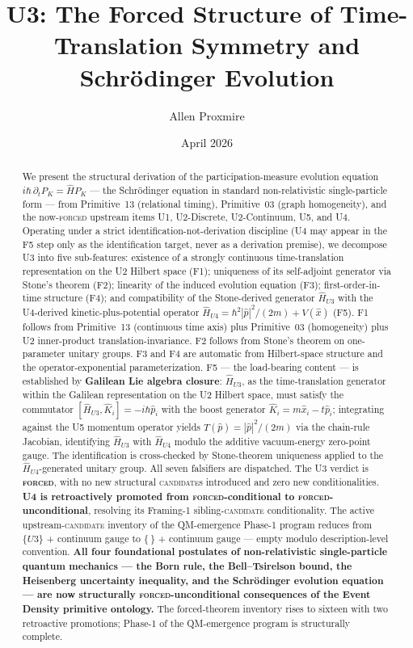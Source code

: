\documentclass[11pt,a4paper]{article}
\title{U3: The Forced Structure of Time-Translation Symmetry and Schr\"odinger Evolution}
\author{Allen Proxmire}
\date{April 2026}
\begin{document}
\maketitle

\begin{abstract}
We present the structural derivation of the participation-measure evolution equation $i\hbar \, \partial_t P_K = \hat{H} P_K$ --- the Schr\"odinger equation in standard non-relativistic single-particle form --- from Primitive~13 (relational timing), Primitive~03 (graph homogeneity), and the now-\textsc{forced} upstream items U1, U2-Discrete, U2-Continuum, U5, and U4. Operating under a strict identification-not-derivation discipline (U4 may appear in the F5 step only as the identification target, never as a derivation premise), we decompose U3 into five sub-features: existence of a strongly continuous time-translation representation on the U2 Hilbert space (F1); uniqueness of its self-adjoint generator via Stone's theorem (F2); linearity of the induced evolution equation (F3); first-order-in-time structure (F4); and compatibility of the Stone-derived generator $\hat{H}_{U3}$ with the U4-derived kinetic-plus-potential operator $\hat{H}_{U4} = \hbar^2|\hat{p}|^2/(2m) + V(\hat{x})$ (F5). F1 follows from Primitive~13 (continuous time axis) plus Primitive~03 (homogeneity) plus U2 inner-product translation-invariance. F2 follows from Stone's theorem on one-parameter unitary groups. F3 and F4 are automatic from Hilbert-space structure and the operator-exponential parameterization. F5 --- the load-bearing content --- is established by \textbf{Galilean Lie algebra closure}: $\hat{H}_{U3}$, as the time-translation generator within the Galilean representation on the U2 Hilbert space, must satisfy the commutator $[\hat{H}_{U3}, \hat{K}_i] = -i\hbar\hat{p}_i$ with the boost generator $\hat{K}_i = m\hat{x}_i - t\hat{p}_i$; integrating against the U5 momentum operator yields $T(\hat{p}) = |\hat{p}|^2/(2m)$ via the chain-rule Jacobian, identifying $\hat{H}_{U3}$ with $\hat{H}_{U4}$ modulo the additive vacuum-energy zero-point gauge. The identification is cross-checked by Stone-theorem uniqueness applied to the $\hat{H}_{U4}$-generated unitary group. All seven falsifiers are dispatched. The U3 verdict is \textbf{\textsc{forced}}, with no new structural \textsc{candidate}s introduced and zero new conditionalities. \textbf{U4 is retroactively promoted from \textsc{forced}-conditional to \textsc{forced}-unconditional}, resolving its Framing-1 sibling-\textsc{candidate} conditionality. The active upstream-\textsc{candidate} inventory of the QM-emergence Phase-1 program reduces from $\{U3\}$ + continuum gauge to $\{ \, \}$ + continuum gauge --- empty modulo description-level convention. \textbf{All four foundational postulates of non-relativistic single-particle quantum mechanics --- the Born rule, the Bell--Tsirelson bound, the Heisenberg uncertainty inequality, and the Schr\"odinger evolution equation --- are now structurally \textsc{forced}-unconditional consequences of the Event Density primitive ontology.} The forced-theorem inventory rises to sixteen with two retroactive promotions; Phase-1 of the QM-emergence program is structurally complete.
\end{abstract}
\end{document}
